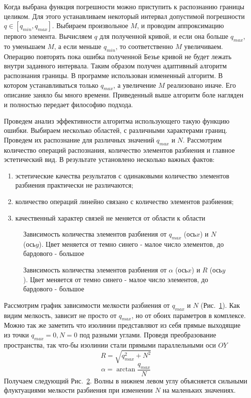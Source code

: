 \documentclass[a4paper,12pt]{report}
\begin{document}
Когда выбрана функция погрешности можно приступить к распознанию границы целиком. Для этого устанавливаем некоторый интервал допустимой погрешности $q\in[q_{min},q_{max}]$. Выбираем произвольное $M$, и проводим аппроксимацию первого элемента. Вычисляем $q$ для полученной кривой, и если она больше $q_{max}$, то уменьшаем $M$, а если меньше $q_{min}$, то соответственно $M$ увеличиваем. Операцию повторять пока ошибка полученной Безье кривой не будет лежать внутри заданного интервала. Таким образом получен адаптивный алгоритм распознания границы. В программе использован измененный алгоритм. В котором устанавливаться только $q_{max}$, а увеличение $M$ реализовано иначе. Его описание заняло бы много времени. Приведенный выше алгоритм боле нагляден и полностью передает философию подхода. 

Проведем анализ эффективности алгоритма использующего такую функцию ошибки. Выбираем несколько областей, с различными характерами границ. Проведем их распознание для различных значений $q_{max}$ и $N$. Рассмотрим количество операций распознания, количество элементов разбиения и главное эстетический вид. В результате установлено несколько важных фактов:
\begin{enumerate}
\item эстетические качества результатов с одинаковыми количество элементов разбиения практически не различаются;
\item количество операций линейно связано с количество элементов разбиения;
\item качественный характер связей не меняется от области к области
\end{enumerate}

\begin{figure}
\center{\texttt{[image: NQ]}}
\caption{Зависимость количества элементов разбиения от $q_{max}$ (ось$x$) и $N$ (ось$y$). Цвет меняется от темно синего - малое число элементов, до бардового - большое}
\label{ris:NQ}
\end{figure}

\begin{figure}
\caption{Зависимость количества элементов разбиения от $\alpha$ (ось$x$) и $R$ (ось$y$). Цвет меняется от темно синего - малое число элементов, до бардового - большое }
\label{ris:NQsph}
\end{figure}

Рассмотрим график зависимости мелкости разбиения от $q_{max}$ и $N$ (Рис.~\ref{ris:NQ}). Как видим мелкость, зависит не просто от $q_{max}$, но от обоих параметров в комплексе. Можно так же заметить что изолинии представляют из себя прямые выходящие из точки $q_{max}=0, N=0$ под разными углами. 
Проведя преобразование пространства, так что-бы изолинии стали прямыми параллельными оси $OY$ 
\[R=\sqrt{q_{max}^2+N^2}\]
\[\alpha=\arctan{\frac{q_{max}}{N}}\]
Получаем следующий Рис.~\ref{ris:NQsph}. Волны в нижнем левом углу объясняется сильными флуктуациями мелкости разбиения при изменении $N$ на маленьких значениях.
\end{document}
